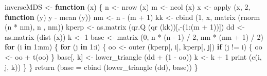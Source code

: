 \documentclass[
  12pt,
]{book}
\newenvironment{Shaded}{\begin{snugshade}}{\end{snugshade}}
\newcommand{\AttributeTok}[1]{\textcolor[rgb]{0.77,0.63,0.00}{#1}}
\newcommand{\ControlFlowTok}[1]{\textcolor[rgb]{0.13,0.29,0.53}{\textbf{#1}}}
\newcommand{\DecValTok}[1]{\textcolor[rgb]{0.00,0.00,0.81}{#1}}
\newcommand{\FunctionTok}[1]{\textcolor[rgb]{0.00,0.00,0.00}{#1}}
\newcommand{\NormalTok}[1]{#1}
\newcommand{\OtherTok}[1]{\textcolor[rgb]{0.56,0.35,0.01}{#1}}
\newcommand{\SpecialCharTok}[1]{\textcolor[rgb]{0.00,0.00,0.00}{#1}}
\theoremstyle{definition}
\theoremstyle{definition}
\theoremstyle{definition}
\theoremstyle{definition}
\theoremstyle{remark}
\begin{document}
\begin{Shaded}
\begin{Highlighting}[]
\NormalTok{inverseMDS }\OtherTok{\textless{}{-}} \ControlFlowTok{function}\NormalTok{ (x) \{}
\NormalTok{  n }\OtherTok{\textless{}{-}} \FunctionTok{nrow}\NormalTok{ (x)}
\NormalTok{  m }\OtherTok{\textless{}{-}} \FunctionTok{ncol}\NormalTok{ (x)}
\NormalTok{  x }\OtherTok{\textless{}{-}} \FunctionTok{apply}\NormalTok{ (x, }\DecValTok{2}\NormalTok{, }\ControlFlowTok{function}\NormalTok{ (y)}
\NormalTok{    y }\SpecialCharTok{{-}} \FunctionTok{mean}\NormalTok{ (y))}
\NormalTok{  nm }\OtherTok{\textless{}{-}}\NormalTok{ n }\SpecialCharTok{{-}}\NormalTok{ (m }\SpecialCharTok{+} \DecValTok{1}\NormalTok{)}
\NormalTok{  kk }\OtherTok{\textless{}{-}} \FunctionTok{cbind}\NormalTok{ (}\DecValTok{1}\NormalTok{, x, }\FunctionTok{matrix}\NormalTok{ (}\FunctionTok{rnorm}\NormalTok{ (n }\SpecialCharTok{*}\NormalTok{ nm), n , nm))}
\NormalTok{  kperp }\OtherTok{\textless{}{-}} \FunctionTok{as.matrix}\NormalTok{ (}\FunctionTok{qr.Q}\NormalTok{ (}\FunctionTok{qr}\NormalTok{ (kk))[,}\SpecialCharTok{{-}}\NormalTok{(}\DecValTok{1}\SpecialCharTok{:}\NormalTok{(m }\SpecialCharTok{+} \DecValTok{1}\NormalTok{))])}
\NormalTok{  dd }\OtherTok{\textless{}{-}} \FunctionTok{as.matrix}\NormalTok{ (}\FunctionTok{dist}\NormalTok{ (x))}
\NormalTok{  k }\OtherTok{\textless{}{-}} \DecValTok{1}
\NormalTok{  base }\OtherTok{\textless{}{-}} \FunctionTok{matrix}\NormalTok{ (}\DecValTok{0}\NormalTok{, n }\SpecialCharTok{*}\NormalTok{ (n }\SpecialCharTok{{-}} \DecValTok{1}\NormalTok{) }\SpecialCharTok{/} \DecValTok{2}\NormalTok{, nm }\SpecialCharTok{*}\NormalTok{ (nm }\SpecialCharTok{+} \DecValTok{1}\NormalTok{) }\SpecialCharTok{/} \DecValTok{2}\NormalTok{)}
  \ControlFlowTok{for}\NormalTok{ (i }\ControlFlowTok{in} \DecValTok{1}\SpecialCharTok{:}\NormalTok{nm) \{}
    \ControlFlowTok{for}\NormalTok{ (j }\ControlFlowTok{in} \DecValTok{1}\SpecialCharTok{:}\NormalTok{i) \{}
\NormalTok{      oo }\OtherTok{\textless{}{-}} \FunctionTok{outer}\NormalTok{ (kperp[, i], kperp[, j])}
      \ControlFlowTok{if}\NormalTok{ (j }\SpecialCharTok{!=}\NormalTok{ i) \{}
\NormalTok{        oo }\OtherTok{\textless{}{-}}\NormalTok{ oo }\SpecialCharTok{+} \FunctionTok{t}\NormalTok{(oo)}
\NormalTok{      \}}
\NormalTok{      base[, k] }\OtherTok{\textless{}{-}} \FunctionTok{lower\_triangle}\NormalTok{ (dd }\SpecialCharTok{+}\NormalTok{ (}\DecValTok{1} \SpecialCharTok{{-}}\NormalTok{ oo))}
\NormalTok{      k }\OtherTok{\textless{}{-}}\NormalTok{ k }\SpecialCharTok{+} \DecValTok{1}
      \FunctionTok{print}\NormalTok{ (}\FunctionTok{c}\NormalTok{(i, j, k))}
\NormalTok{    \}}
\NormalTok{  \}}
  \FunctionTok{return}\NormalTok{ (}\AttributeTok{base =} \FunctionTok{cbind}\NormalTok{ (}\FunctionTok{lower\_triangle}\NormalTok{ (dd), base))}
\NormalTok{\}}


\end{Highlighting}
\end{Shaded}
\end{document}
